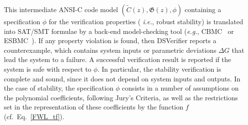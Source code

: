 \documentclass{sig-alternate-05-2015}
\begin{document}
This intermediate ANSI-C code model $(\tilde C(z),\mathfrak{G}(z),\phi)$
containing a specification $\phi$ for the verification properties ({\it
i.e.}, robust stability) is translated into SAT/SMT formulae by a back-end
model-checking tool ({\it e.g.}, CBMC~\cite{ClarkeKL04} or
ESBMC~\cite{CordeiroFM12}).  If any property violation is found, then
DSVerifier reports a counterexample, which contains system inputs or
parametric deviations $\Delta{G}$ that lead the system to a failure.  A
successful verification result is reported if the system is safe with
respect to $\phi$.  In particular, the stability verification is complete
and sound, since it does not depend on system inputs and outputs.  In the
case of stability, the specification $\phi$ consists in a number of
assumptions on the polynomial coefficients, following Jury's Criteria, as
well as the restrictions set in the representation of these coefficients by
the function $f$ (cf.~Eq.~\eqref{FWL_tf}).


%
\end{document}

